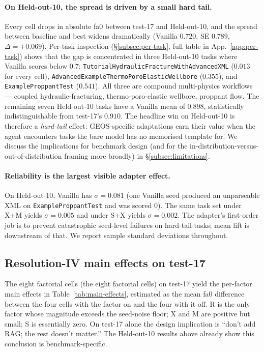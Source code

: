 \documentclass{article}
\begin{document}
\paragraph{On Held-out-10, the spread is driven by a small hard tail.} Every cell drops in absolute fa0 between test-17 and Held-out-10, and the spread between baseline and best widens dramatically (Vanilla $0.720$, SE $0.789$, $\Delta = +0.069$). Per-task inspection (\S\ref{subsec:per-task}, full table in App.~\ref{app:per-task}) shows that the gap is concentrated in three Held-out-10 tasks where Vanilla scores below $0.7$: \texttt{TutorialHydraulicFractureWithAdvancedXML} ($0.013$ for every cell), \texttt{AdvancedExampleThermoPoroElasticWellbore} ($0.355$), and \texttt{ExampleProppantTest} ($0.541$). All three are compound multi-physics workflows --- coupled hydraulic-fracturing, thermo-poro-elastic wellbore, proppant flow. The remaining seven Held-out-10 tasks have a Vanilla mean of $0.898$, statistically indistinguishable from test-17's $0.910$. The headline win on Held-out-10 is therefore a \emph{hard-tail} effect: GEOS-specific adaptations earn their value when the agent encounters tasks the bare model has no memorised template for. We discuss the implications for benchmark design (and for the in-distribution-versus-out-of-distribution framing more broadly) in \S\ref{subsec:limitations}.

\paragraph{Reliability is the largest visible adapter effect.} On Held-out-10, Vanilla has $\sigma=0.081$ (one Vanilla seed produced an unparseable XML on \texttt{ExampleProppantTest} and was scored 0). The same task set under X+M yields $\sigma=0.005$ and under S+X yields $\sigma=0.002$. The adapter's first-order job is to prevent catastrophic seed-level failures on hard-tail tasks; mean lift is downstream of that. We report sample standard deviations throughout.

\subsection{Resolution-IV main effects on test-17}
\label{subsec:main-effects}

The eight factorial cells (the eight factorial cells) on test-17 yield the per-factor main effects in Table~\ref{tab:main-effects}, estimated as the mean fa0 difference between the four cells with the factor on and the four with it off. R is the only factor whose magnitude exceeds the seed-noise floor; X and M are positive but small; S is essentially zero. On test-17 alone the design implication is ``don't add RAG; the rest doesn't matter.'' The Held-out-10 results above already show this conclusion is benchmark-specific.
\end{document}
